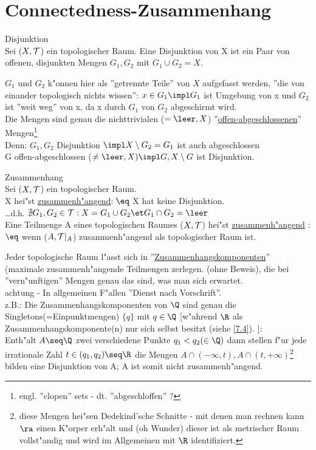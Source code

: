 \section{Connectedness-Zusammenhang}

\begin{definition}\label{7.1}Disjunktion\\
Sei ($X,\mathcal T$) ein topologischer Raum. Eine Disjunktion von X ist ein Paar von offenen, disjunkten Mengen $G_1, G_2$ mit $G_1\cup G_2=X$.
\end{definition}
$G_1$ und $G_2$ k"onnen hier als ''getrennte Teile'' von $X$ aufgefasst werden, ''die von einander topologisch nichts wissen'': $x\in G_1\impl G_1$ ist Umgebung von  x und $G_2$ ist ''weit weg'' von x, da x durch $G_1$ von $G_2$ abgeschirmt wird.\\
Die Mengen sind genau die nichttrivialen ($=\leer , X$) ''\ul{offen-abgeschlossenen}'' Mengen\footnote{engl. ''clopen'' sets - dt. ''abgeschloffen'' ?}\\
Denn: $G_1, G_2$ Disjunktion $\impl X\setminus G_2 =G_1$ ist auch abgeschlossen\\
\hspace*{0.6cm} G offen-abgeschlossen ($\neq \leer ,X ) \impl G, X\setminus G$ ist Disjunktion.\\

\begin{definition}\label{7.2}Zusammenhang\\
Sei ($X,\mathcal T$) ein topologischer Raum.\\
X hei"st \ul{zusammenh"angend}$:\eq $ X hat keine Disjunktion.\\
\dots d.h. $\nexists G_1, G_2 \in\T: X=G_1\cup G_2\et G_1\cap G_2 =\leer$\\
Eine Teilmenge A eines topologischen Raumes ($X,\mathcal T$) hei"st \ul{zusammenh"angend} :$\eq$ wenn ($A,\mathcal T |_A$) zusammenh"angend als topologischer Raum ist.
\end{definition}
Jeder topologische Raum l"asst sich in ''\ul{Zusammenhangskomponenten}'' (maximale zusammenh"angende Teilmengen zerlegen. (ohne Beweis), die bei ''vern"unftigen'' Mengen genau das sind, was man sich erwartet.\\
{\sc achtung} - In allgemeinen F"allen ''Dienst nach Vorschrift''.\\
z.B.: Die Zusammenhangskomponenten von $\Q$ sind genau die Singletons(=Einpunktmengen) $\{ q\}$ mit $q\in\Q$ [w"ahrend $\R$ als Zusammenhangskomponente(n) nur sich selbst besitzt (siehe \ref{7.4}). ]:\\
Enth"alt $A\seq \Q$ zwei verschiedene Punkte $q_1< q_2(\in\Q )$ dann stellen f"ur jede irrationale Zahl $t\in (q_1,q_2)\seq\R$ die Mengen $A\cap (-\infty ,t), A\cap (t,+\infty)$\footnote{diese Mengen hei"sen {\sc Dedekind}'sche Schnitte - mit denen man rechnen kann $\ra$ einen K"orper erh"alt und (oh Wunder) dieser ist als metrischer Raum vollst"andig und wird im Allgemeinen mit $\R$ identifiziert.} bilden eine Disjunktion von A; A ist somit nicht zusammenh"angend.

